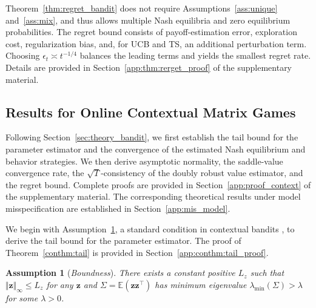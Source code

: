 \documentclass[12pt]{article}
\newtheorem{assumption}{Assumption}[section]
\begin{document}
Theorem~\ref{thm:regret_bandit} does not require Assumptions~\ref{ass:unique} and~\ref{ass:mix}, and thus allows multiple Nash equilibria and zero equilibrium probabilities. The regret bound consists of payoff-estimation error, exploration cost, regularization bias, and, for UCB and TS, an additional perturbation term. Choosing $\epsilon_t\asymp t^{-1/4}$ balances the leading terms and yields the smallest regret rate. Details are provided in Section~\ref{app:thm:rerget_proof} of the supplementary material.

\subsection{Results for Online Contextual Matrix Games}
\label{sec:theory_con}
Following Section~\ref{sec:theory_bandit}, we first establish the tail bound for the parameter estimator and the convergence of the estimated Nash equilibrium and behavior strategies. We then derive asymptotic normality, the saddle-value convergence rate, the $\sqrt{T}$-consistency of the doubly robust value estimator, and the regret bound. Complete proofs are provided in Section~\ref{app:proof_context} of the supplementary material. The corresponding theoretical results under model misspecification are established in Section~\ref{app:mis_model}.


We begin with Assumption~\ref{ass:bound}, a standard condition in contextual bandits \citep{chen2021statistical,tajik2024novel,shen2024doubly}, to derive the tail bound for the parameter estimator. The proof of Theorem~\ref{conthm:tail} is provided in Section~\ref{app:conthm:tail_proof}.

\begin{assumption}[\emph{Boundness}]
\label{ass:bound}
    There exists a constant positive $L_z$ such that $\Vert \bm{z} \Vert_\infty \le L_z$ for any $\bm{z}$ and $\Sigma = \mathbb{E}( \bm{z} \bm{z}^\top)$ has minimum eigenvalue $\lambda_{\min}(\Sigma) > \lambda$ for some $\lambda > 0$.
\end{assumption}
\end{document}
